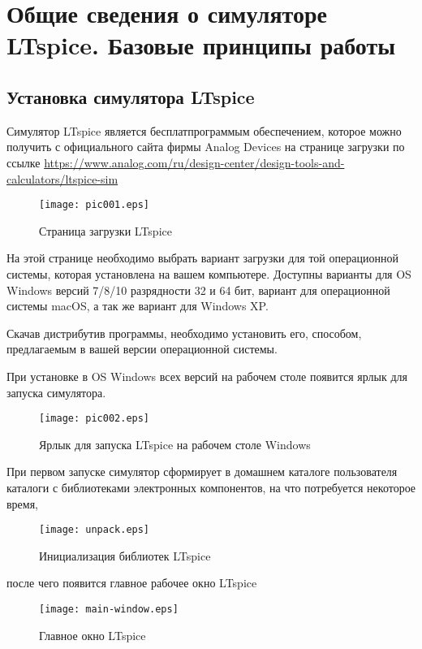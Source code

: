 \chapter{Общие сведения о симуляторе LTspice. Базовые принципы работы}

\section{Установка симулятора LTspice}

Симулятор LTspice является бесплатпрограммым обеспечением, которое можно 
получить с официального сайта фирмы Analog Devices на странице загрузки по 
ссылке 
\href{
https://www.analog.com/ru/design-center/design-tools-and-calculators/ltspice-sim 
ulator.html}{
https://www.analog.com/ru/design-center/design-tools-and-calculators/ltspice-sim
}

\begin{figure}[H]
 \centering
 \texttt{[image: pic001.eps]}
 \caption{Страница загрузки LTspice}
 \label{fig:download-page}
\end{figure}
На этой странице необходимо выбрать вариант загрузки для той операционной 
системы, которая установлена на вашем компьютере. Доступны варианты для OS 
Windows версий 7/8/10 разрядности 32 и 64 бит, вариант для операционной системы 
macOS, а так же вариант для Windows XP.

Скачав дистрибутив программы, необходимо установить его, способом, предлагаемым 
в вашей версии операционной системы.

При установке в OS Windows всех версий на рабочем столе появится ярлык для 
запуска симулятора.

\begin{figure}[H]
 \centering
 \texttt{[image: pic002.eps]}
 \caption{Ярлык для запуска LTspice на рабочем столе Windows}
 \label{fig:ltspice-icon}
\end{figure}

При первом запуске симулятор сформирует в домашнем каталоге пользователя 
каталоги с библиотеками электронных компонентов, на что потребуется некоторое 
время, 

\begin{figure}[H]
 \centering
 \texttt{[image: unpack.eps]}
 \caption{Инициализация библиотек LTspice}
 \label{fig:unpack}
\end{figure}
после чего появится главное рабочее окно LTspice

\begin{figure}[H]
 \centering
 \texttt{[image: main-window.eps]}
 \caption{Главное окно LTspice}
 \label{fig:main-window}
\end{figure}


